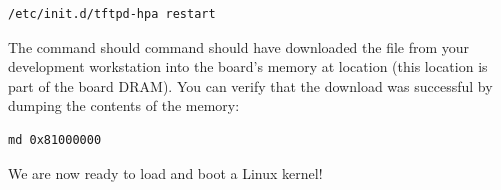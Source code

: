 \begin{verbatim}
/etc/init.d/tftpd-hpa restart
\end{verbatim}

The  command should command should have downloaded the
 file from your development workstation into the
board's memory at location  (this location is part of
the board DRAM). You can verify that the download was successful by
dumping the contents of the memory:

\begin{verbatim}
md 0x81000000
\end{verbatim}

We are now ready to load and boot a Linux kernel!
